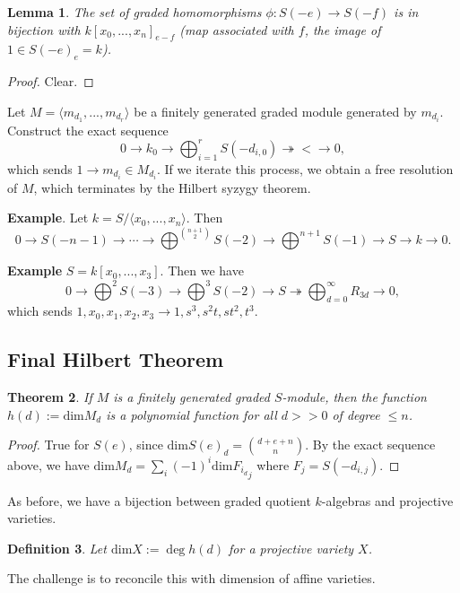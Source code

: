 \documentclass[letterpaper, 12pt]{article}
\newtheorem{thm}{Theorem}[subsection]
\newtheorem{lem}[thm]{Lemma}
\newtheorem{definition}[thm]{Definition}
\renewcommand{\dim}{\mathrm{dim}}
\newcommand{\polyring}[3]{#1[x_{#2}, ..., x_{#3}]}
\begin{document}
\begin{lem}
  The set of graded homomorphisms $\phi: S(-e) \rightarrow S(-f)$ is in bijection with ${\polyring k 0 n}_{e - f}$ (map associated with $f$, the image of $1 \in S(-e)_e = k$).
\end{lem}
\begin{proof}
Clear.
\end{proof}

Let $M = \langle m_{d_1}, ..., m_{d_r} \rangle$ be a finitely generated graded module generated by $m_{d_i}$. Construct the exact sequence \[ 0 \rightarrow k_0 \rightarrow \bigoplus_{i = 1}^{r} S(-d_{i, 0}) \twoheadrightarrow < \rightarrow 0, \] which sends $1 \rightarrow m_{d_i} \in M_{d_i}$. If we iterate this process, we obtain a free resolution of $M$, which terminates by the Hilbert syzygy theorem.

\textbf{Example}. Let $k = S/\langle x_0, ..., x_n \rangle$. Then \[0 \rightarrow S(-n - 1) \rightarrow \cdots \rightarrow \bigoplus^{\binom {n + 1} 2} S(-2) \rightarrow \bigoplus^{n + 1} S(-1) \rightarrow S \rightarrow k \rightarrow 0.\]

\textbf{Example} $S = \polyring k 0 3$. Then we have \[ 0 \rightarrow \bigoplus^2  S(-3) \rightarrow \bigoplus^3 S(-2) \rightarrow S \twoheadrightarrow \bigoplus_{d = 0}^\infty R_{3d} \rightarrow 0, \] which sends $1, x_0, x_1, x_2, x_3 \rightarrow 1, s^3, s^2 t, s t^2, t^3$.

\subsection{Final Hilbert Theorem}
\begin{thm}
If $M$ is a finitely generated graded $S$-module, then the function $h(d) := \dim M_d$ is a polynomial function for all $d >> 0$ of degree $\leq n$.
\end{thm}

\begin{proof}
  True for $S(e)$, since $\dim S(e)_d = \binom {d + e + n} n$. By the exact sequence above, we have $\dim M_d = \sum_i (-1)^i \dim {F_{i_d}}_j$ where $F_j = S(-d_{i, j})$.
\end{proof}

As before, we have a bijection between graded quotient $k$-algebras and projective varieties.

\begin{definition}
Let $\dim X := \deg h(d)$ for a projective variety $X$.
\end{definition}

The challenge is to reconcile this with dimension of affine varieties.
\end{document}
